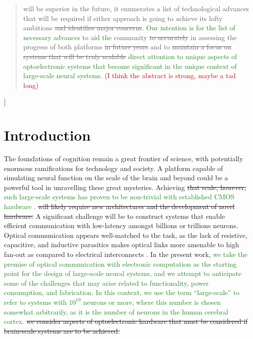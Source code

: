 \documentclass[twocolumn]{article}
\begin{document}
\begin{@twocolumnfalse}
\begin{abstract}
will be superior in the future, it enumerates a list of technological advances that will be required if either approach is going to achieve its lofty ambitions \sout{and identifies major concerns}. \textcolor{ForestGreen}{Our intention is for the list of necessary advances to aid the} community \sout{to accurately} in assessing the progress of both platforms \sout{in future years} and to \sout{maintain a focus on systems that will be truly scalable} \textcolor{ForestGreen}{direct attention to unique aspects of optoelectronic systems that become significant in the unique context of large-scale neural systems}. \textcolor{red}{(I think the abstract is strong, maybe a tad long)}
\vspace{2em}
\end{abstract}
\end{@twocolumnfalse}
]

\setcounter{tocdepth}{4}
\setcounter{secnumdepth}{4}
\tableofcontents

\section{\label{sec:introduction}Introduction}

The foundations of cognition remain a great frontier of science, with potentially enormous ramifications for technology and society. A platform capable of simulating neural function on the scale of the brain and beyond could be a powerful tool in unravelling these great mysteries. Achieving \sout{that scale, however,} \textcolor{ForestGreen}{such large-scale systems has proven to be non-trivial with established CMOS hardware \cite{}.}  \sout{will likely require new architectures and the development of novel hardware.} A significant challenge will be to construct systems that enable efficient communication with low-latency amongst billions or trillions neurons. Optical communication appears well-matched to the task, as the lack of resistive, capacitive, and inductive parasitics makes optical links more amenable to high fan-out as compared to electrical interconnects \cite{shainline2018largest}. In the present work, \textcolor{ForestGreen}{we take the premise of optical communication with electronic computation as the starting point for the design of large-scale neural systems, and we attempt to anticipate some of the challenges that may arise related to functionality, power consumption, and fabrication. In this context, we use the term ``large-scale'' to refer to systems with $10^{10}$ neurons or more, where this number is chosen somewhat arbitrarily, as it is the number of neurons in the human cerebral cortex.} \sout{we consider aspects of optoelectronic hardware that must be considered if brain-scale systems are to be achieved.}
\end{document}
